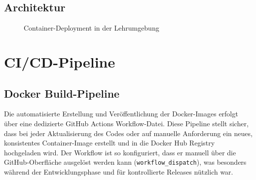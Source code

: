 \documentclass{article}
\begin{document}
\subsection{Architektur}
\begin{figure}[H]
  \centering
  \caption{Container-Deployment in der Lehrumgebung}\label{fig:container}
\end{figure}

\newpage

\section{CI/CD-Pipeline}

\subsection{Docker Build-Pipeline}
\noindent
Die automatisierte Erstellung und Veröffentlichung der Docker-Images erfolgt über eine dedizierte GitHub Actions Workflow-Datei. Diese Pipeline stellt sicher, dass bei jeder Aktualisierung des Codes oder auf manuelle Anforderung ein neues, konsistentes Container-Image erstellt und in die Docker Hub Registry hochgeladen wird.
\noindent
Der Workflow ist so konfiguriert, dass er manuell über die GitHub-Oberfläche ausgelöst werden kann (\texttt{workflow\_dispatch}), was besonders während der Entwicklungsphase und für kontrollierte Releases nützlich war.
\end{document}
